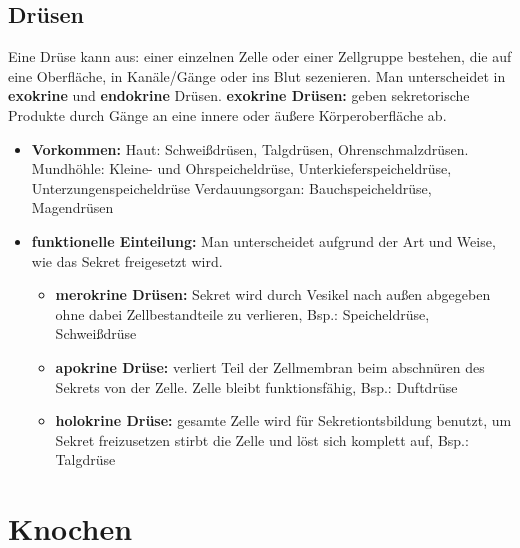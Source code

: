 \documentclass{article}
\begin{document}
\subsection{Drüsen}
Eine Drüse kann aus: einer einzelnen Zelle oder einer Zellgruppe bestehen, die auf eine Oberfläche, in Kanäle/Gänge oder ins Blut sezenieren.
\newline
\newline Man unterscheidet in \textbf{exokrine} und \textbf{endokrine} Drüsen.
\newline
\newline
\textbf{exokrine Drüsen:} geben sekretorische Produkte durch Gänge an eine innere oder äußere Körperoberfläche ab.
\begin{itemize}
    \item \textbf{Vorkommen:} 
    \newline Haut: Schweißdrüsen, Talgdrüsen, Ohrenschmalzdrüsen. 
    \newline Mundhöhle: Kleine- und Ohrspeicheldrüse, Unterkieferspeicheldrüse, Unterzungenspeicheldrüse 
    \newline Verdauungsorgan: Bauchspeicheldrüse, Magendrüsen
    \item \textbf{funktionelle Einteilung:} Man unterscheidet aufgrund der Art und Weise, wie das Sekret freigesetzt wird.
    \begin{itemize}
        \item \textbf{merokrine Drüsen:} Sekret wird durch Vesikel nach außen abgegeben ohne dabei Zellbestandteile  zu verlieren, Bsp.: Speicheldrüse, Schweißdrüse
        \item \textbf{apokrine Drüse:} verliert Teil der Zellmembran beim abschnüren des Sekrets von der Zelle. Zelle bleibt funktionsfähig, Bsp.: Duftdrüse
        \item \textbf{holokrine Drüse:} gesamte Zelle wird für Sekretiontsbildung benutzt, um Sekret freizusetzen stirbt die Zelle und löst sich komplett auf, Bsp.: Talgdrüse
    \end{itemize}
\end{itemize}

\normalsize
\newpage
\section{Knochen}
\end{document}
